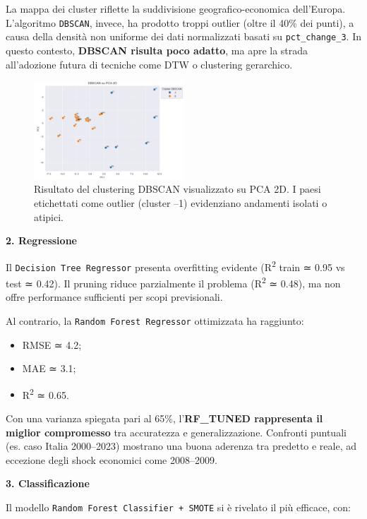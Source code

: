 \documentclass[conference]{IEEEtran}
\begin{document}
\begin{itemize}
La mappa dei cluster riflette la suddivisione geografico-economica dell’Europa. L’algoritmo \texttt{DBSCAN}, invece, ha prodotto troppi outlier (oltre il 40\% dei punti), a causa della densità non uniforme dei dati normalizzati basati su \texttt{pct\_change\_3}. In questo contesto, \textbf{DBSCAN risulta poco adatto}, ma apre la strada all’adozione futura di tecniche come DTW o clustering gerarchico.
\begin{figure}[H]
\centering
\includegraphics[width=0.5\textwidth]{DBSCAN.png}
\caption{Risultato del clustering DBSCAN visualizzato su PCA 2D. I paesi etichettati come outlier (cluster –1) evidenziano andamenti isolati o atipici.}
\label{fig:dbscan-pca}
\end{figure}


\noindent\textbf{2. Regressione}

Il \texttt{Decision Tree Regressor} presenta overfitting evidente (R\textsuperscript{2} train ≃ 0.95 vs test ≃ 0.42). Il pruning riduce parzialmente il problema (R\textsuperscript{2} ≃ 0.48), ma non offre performance sufficienti per scopi previsionali.

Al contrario, la \texttt{Random Forest Regressor} ottimizzata ha raggiunto:

\begin{itemize}
  \item RMSE ≃ 4.2;
  \item MAE ≃ 3.1;
  \item R\textsuperscript{2} ≃ 0.65.
\end{itemize}

Con una varianza spiegata pari al 65\%, l’\textbf{RF\_TUNED rappresenta il miglior compromesso} tra accuratezza e generalizzazione. Confronti puntuali (es. caso Italia 2000–2023) mostrano una buona aderenza tra predetto e reale, ad eccezione degli shock economici come 2008–2009.

\noindent\textbf{3. Classificazione}

Il modello \texttt{Random Forest Classifier + SMOTE} si è rivelato il più efficace, con:


\end{itemize}
\end{document}
